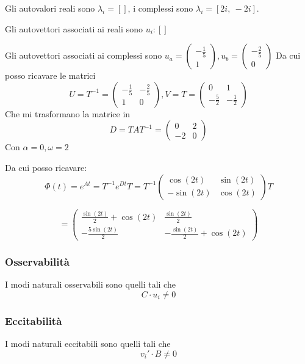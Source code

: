 \documentclass{article}
\begin{document}
Gli autovalori reali sono $\lambda_i = []$, i complessi sono $\lambda_i = \left[ 2 i, \  - 2 i\right]$.

Gli autovettori associati ai reali sono $ u_i: [   ]$

Gli autovettori associati ai complessi sono $ u_a = \left(\begin{matrix}- \frac{1}{5}\\1\end{matrix}\right), u_b = \left(\begin{matrix}- \frac{2}{5}\\0\end{matrix}\right)$
Da cui posso ricavare le matrici \[U=T^{-1} = \left(\begin{matrix}- \frac{1}{5} & - \frac{2}{5}\\1 & 0\end{matrix}\right), V = T = \left(\begin{matrix}0 & 1\\- \frac{5}{2} & - \frac{1}{2}\end{matrix}\right)\]
Che mi trasformano la matrice in \[ D = TAT^{-1} = \left(\begin{matrix}0 & 2\\-2 & 0\end{matrix}\right) \]
Con $\alpha = 0, \omega =2 $

Da cui posso ricavare: \[ \Phi(t) = e^{At} = T^{-1} e^{Dt} T =  T^{-1} \left(\begin{matrix}\cos{\left(2 t \right)} & \sin{\left(2 t \right)}\\- \sin{\left(2 t \right)} & \cos{\left(2 t \right)}\end{matrix}\right) T\]

\[ = \left(\begin{matrix}\frac{\sin{\left(2 t \right)}}{2} + \cos{\left(2 t \right)} & \frac{\sin{\left(2 t \right)}}{2}\\- \frac{5 \sin{\left(2 t \right)}}{2} & - \frac{\sin{\left(2 t \right)}}{2} + \cos{\left(2 t \right)}\end{matrix}\right) \]\subsubsection{Osservabilità}
 I modi naturali osservabili sono quelli tali che 
\[ C \cdot u_i   \neq 0\]
\subsubsection{Eccitabilità}
 I modi naturali eccitabili sono quelli tali che 
\[v_i' \cdot B \neq 0\]
\end{document}
